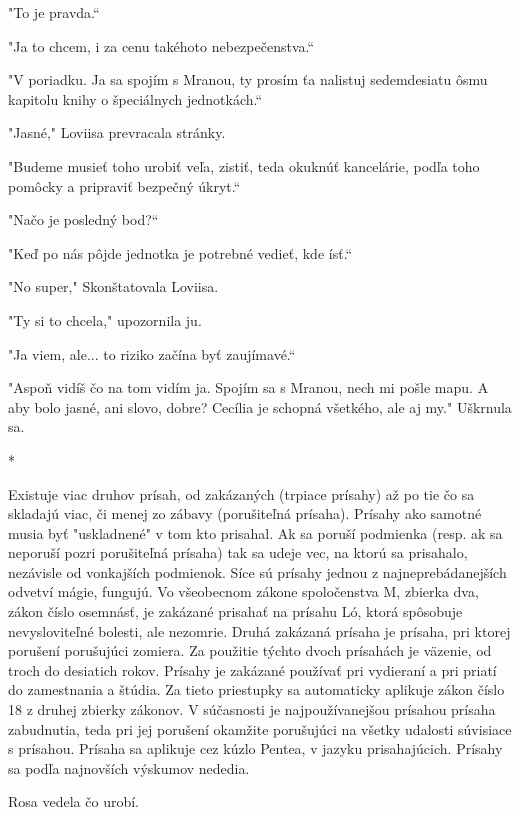\documentclass{book}
\begin{document}
"$ $To je pravda.“

"$ $Ja to chcem, i za cenu takéhoto nebezpečenstva.“

"$ $V poriadku. Ja sa spojím s Mranou, ty prosím ťa nalistuj sedemdesiatu ôsmu kapitolu knihy o špeciálnych jednotkách.“

"$ $Jasné,"$ $ Loviisa prevracala stránky.

"$ $Budeme musieť toho urobiť veľa, zistiť, teda okuknúť kancelárie, podľa toho pomôcky a pripraviť bezpečný úkryt.“

"$ $Načo je posledný bod?“

"$ $Keď po nás pôjde jednotka je potrebné vedieť, kde ísť.“

"$ $No super,"$ $ Skonštatovala Loviisa.

"$ $Ty si to chcela,"$ $ upozornila ju.

"$ $Ja viem, ale... to riziko začína byť zaujímavé.“

"$ $Aspoň vidíš čo na tom vidím ja. Spojím sa s Mranou, nech mi pošle mapu. A aby bolo jasné, ani slovo, dobre? Cecília je schopná všetkého, ale aj my."$ $ Uškrnula sa.

\begin{center}
*
\end{center}

Existuje viac druhov prísah, od zakázaných (trpiace prísahy) až po tie čo sa skladajú viac, či menej zo zábavy (porušiteľná prísaha). Prísahy ako samotné musia byť "$ $uskladnené"$ $ v tom kto prisahal. Ak sa poruší podmienka (resp. ak sa neporuší pozri porušiteľná prísaha) tak sa udeje vec, na ktorú sa prisahalo, nezávisle od vonkajších podmienok. Síce sú prísahy jednou z najneprebádanejších odvetví mágie, fungujú. Vo všeobecnom zákone spoločenstva M, zbierka dva, zákon číslo osemnásť, je zakázané prisahať na prísahu Ló, ktorá spôsobuje nevysloviteľné bolesti, ale nezomrie. Druhá zakázaná prísaha je prísaha, pri ktorej porušení porušujúci zomiera. Za použitie týchto dvoch prísahách je väzenie, od troch do desiatich rokov. Prísahy je zakázané používať pri vydieraní a pri priatí do zamestnania a štúdia. Za tieto priestupky sa automaticky aplikuje zákon číslo 18 z druhej zbierky zákonov. V súčasnosti je najpoužívanejšou prísahou prísaha zabudnutia, teda pri jej porušení okamžite porušujúci na všetky udalosti súvisiace s prísahou. Prísaha sa aplikuje cez kúzlo Pentea, v jazyku prisahajúcich. Prísahy sa podľa najnovších výskumov nededia.

Rosa vedela čo urobí.
\end{document}
